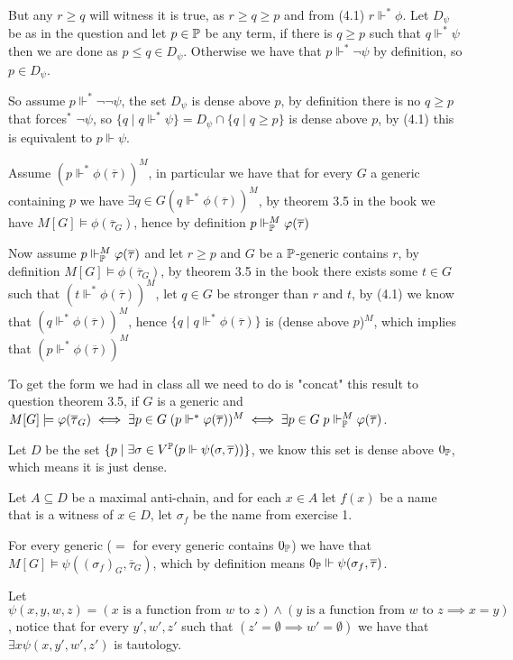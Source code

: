 But any $r\ge q$ will witness it is true, as $r\ge q\ge p$ and from (4.1) $r\Vdash^* \phi$.
\sub{}
Let $D_\psi$ be as in the question and let $p\in \Bbb P$ be any term, if there is $q\ge p$ such that $q\Vdash^* \psi$ then we are done as $p\le q\in D_\psi$.
Otherwise we have that $p\Vdash^* \lnot\psi$ by definition, so $p\in D_\psi$.

So assume $p\Vdash^*\lnot\lnot\psi$, the set $D_\psi$ is dense above $p$, by definition there is no $q\ge p$ that forces$^*$ $\lnot\psi$, so $\{q\mid q\Vdash^* \psi\}=D_\psi\cap \{q\mid q\ge p\}$ is dense above $p$, by (4.1) this is equivalent to $p\Vdash\psi$.

\ex[6]{}
Assume $(p\Vdash^*\phi(\overline\tau))^M$, in particular we have that for every $G$ a generic containing $p$ we have $\exists q\in G (q\Vdash^* \phi(\overline{\tau}))^M$, by theorem 3.5 in the book we have $M[G]\models \phi(\overline{\tau}_G)$, hence by definition $p\Vdash_\Bbb P^M \phi(\overline{\tau})$

Now assume $p\Vdash_\Bbb P^M \phi(\overline{\tau})$ and let $r\ge p$ and $G$ be a $\Bbb P$-generic contains $r$, by definition $M[G]\models \phi(\overline{\tau}_G)$, by theorem 3.5 in the book there exists some $t\in G$ such that $(t\Vdash^*\phi(\overline\tau))^M$, let $q\in G$ be stronger than $r$ and $t$, by (4.1) we know that $(q\Vdash^*\phi(\overline\tau))^M$, hence $\{q\mid q\Vdash^*\phi(\overline\tau)\}$ is (dense above $p$)$^M$, which implies that $(p\Vdash^*\phi(\overline\tau))^M$

To get the form we had in class all we need to do is "concat" this result to question theorem 3.5, if $G$ is a generic and $M[G]\models \phi(\overline{\tau}_G)\iff \exists p\in G\; (p\force^*\phi(\overline{\tau}))^M\iff \exists p\in G\; p\force_\P^M \phi(\overline{\tau})$.

\newpage
\ex{}
\sub{}
Let $D$ be the set $\{p\mid \exists \sigma\in V^\Bbb P (p\Vdash \psi(\sigma, \overline{\tau}))\}$, we know this set is dense above $0_\Bbb P$, which means it is just dense.

Let $A\subseteq D$ be a maximal anti-chain, and for each $x\in A$ let $f(x)$ be a name that is a witness of $x\in D$, let $\sigma_f$ be the name from exercise 1.

For every generic ($=$ for every generic contains $0_\Bbb P$) we have that $M[G]\models \psi((\sigma_f)_G,\overline{\tau}_G)$, which by definition means $0_\Bbb P\Vdash \psi(\sigma_f, \overline{\tau})$.

\sub{}
Let $\psi(x,y,w,z)=(x \text{ is a function from $w$ to $z$})\land (y\text{ is a function from $w$ to $z$}\implies x=y)$, notice that for every $y',w',z'$ such that $(z'=\emptyset\implies w'=\emptyset)$ we have that $\exists x\psi(x,y',w',z')$ is tautology.

